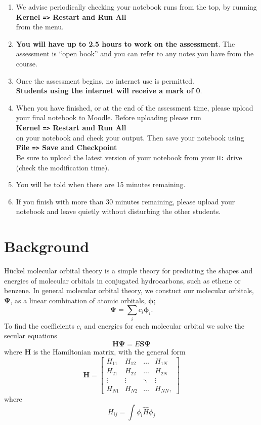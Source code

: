 \documentclass[a4paper]{article}
\newcommand{\bvec}[1]{\boldsymbol{\mathbf{#1}}}
\begin{document}
\begin{enumerate}
  \item We advise periodically checking your notebook runs from the top, by running \\\textbf{Kernel \texttt{=>} Restart and Run All}\\ from the menu.
  \item \textbf{You will have up to 2.5 hours to work on the assessment}. The assessment is ``open book'' and you can refer to any notes you have from the course.
  \item Once the assessment begins, no internet use is permitted.\\\textbf{Students using the internet will receive a mark of 0}.
  \item When you have finished, or at the end of the assessment time, please upload your final notebook to Moodle. Before uploading please run \\\textbf{Kernel \texttt{=>} Restart and Run All}\\ on your notebook and check your output. Then save your notebook using \\\textbf{File \texttt{=>} Save and Checkpoint}\\ Be sure to upload the latest version of your notebook from your \texttt{H:} drive (check the modification time).
  \item You will be told when there are 15 minutes remaining.
  \item If you finish with more than 30 minutes remaining, please upload your notebook and leave quietly without disturbing the other students.
\end{enumerate}
\pagebreak
\section*{Background}
H\"{u}ckel molecular orbital theory is a simple theory for predicting the shapes and energies of molecular orbitals in conjugated hydrocarbons, such as ethene or benzene. In general molecular orbital theory, we constuct our molecular orbitals, $\bvec{\Psi}$, as a linear combination of atomic orbitals, $\bvec{\phi}$;
\begin{equation}
\bvec{\Psi} = \sum_i c_i\bvec{\phi}_i.
\label{eqn:LCAOs}
\end{equation}
To find the coefficients $c_i$ and energies for each molecular orbital we solve the secular equations
\begin{equation}
\bvec{H}\bvec{\Psi} = E\bvec{S}\bvec{\Psi}
\end{equation}
where $\bvec{H}$ is the Hamiltonian matrix, with the general form
\begin{equation}
\bvec{H}=\begin{bmatrix}
H_{11} & H_{12} & \ldots & H_{1N} \\
H_{21} & H_{22} & \ldots & H_{2N} \\
\vdots & \vdots & \ddots & \vdots \\
H_{N1} & H_{N2} & \ldots & H_{NN},
\end{bmatrix}
\end{equation}
where
\begin{equation}
H_{ij} = \int \phi_i \hat{H} \phi_j
\end{equation}
\end{document}
